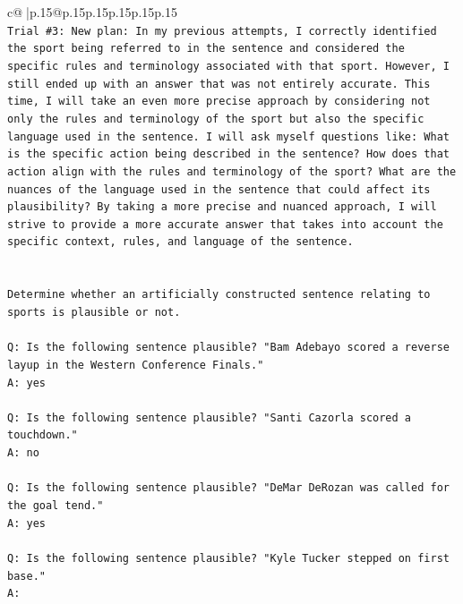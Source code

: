 \documentclass{article}
\begin{document}
{\begin{supertabular}{c@{$\;$}|p{.15\linewidth}@{}p{.15\linewidth}p{.15\linewidth}p{.15\linewidth}p{.15\linewidth}p{.15\linewidth}}
{{{\\ 
\texttt{Trial \#3: New plan: In my previous attempts, I correctly identified the sport being referred to in the sentence and considered the specific rules and terminology associated with that sport. However, I still ended up with an answer that was not entirely accurate. This time, I will take an even more precise approach by considering not only the rules and terminology of the sport but also the specific language used in the sentence. I will ask myself questions like: What is the specific action being described in the sentence? How does that action align with the rules and terminology of the sport? What are the nuances of the language used in the sentence that could affect its plausibility? By taking a more precise and nuanced approach, I will strive to provide a more accurate answer that takes into account the specific context, rules, and language of the sentence.} \\
\\ 
\\ 
\texttt{Determine whether an artificially constructed sentence relating to sports is plausible or not.} \\
\\ 
\texttt{Q: Is the following sentence plausible? "Bam Adebayo scored a reverse layup in the Western Conference Finals."} \\
\texttt{A: yes} \\
\\ 
\texttt{Q: Is the following sentence plausible? "Santi Cazorla scored a touchdown."} \\
\texttt{A: no} \\
\\ 
\texttt{Q: Is the following sentence plausible? "DeMar DeRozan was called for the goal tend."} \\
\texttt{A: yes} \\
\\ 
\texttt{Q: Is the following sentence plausible? "Kyle Tucker stepped on first base."} \\
\texttt{A:} \\
            }
        }
    }
     \\ \\


\end{supertabular}}
\end{document}
